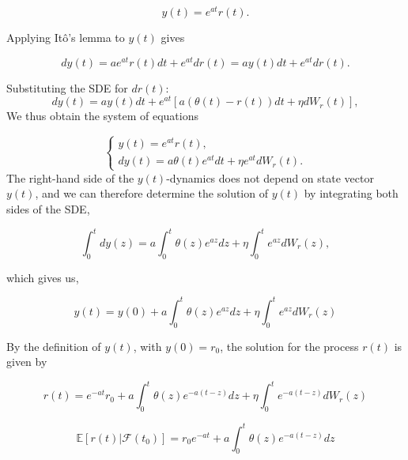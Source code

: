     \begin{equation}
        y(t) = e^{a t} r(t). 
    \end{equation}

    \noindent
    Applying Itô's lemma to \(y(t)\) gives

    \begin{equation}
        dy(t) = a e^{a t} r(t) dt + e^{a t} dr(t) = a y(t) dt + e^{a t} dr(t).
    \end{equation}

    \noindent
    Substituting the SDE for \(dr(t)\):
    \begin{equation}
        dy(t) = a y(t)dt + e^{a t}[a (\theta(t) - r(t))dt + \eta dW_r(t)],
    \end{equation}
    We thus obtain the system of equations
    
    \[
    \begin{cases}
    y(t) = e^{a t}r(t), \\
    dy(t) = a\theta(t)e^{a t}dt + \eta e^{a t}dW_r(t).
    \end{cases}
    \]
    The right-hand side of the \( y(t) \)-dynamics does not depend on state vector \( y(t) \), and we can therefore determine the solution of \( y(t) \) by integrating both sides of the SDE,
    
    \begin{equation}
        \int_0^t dy(z) = a \int_0^t \theta(z)e^{a z}dz + \eta \int_0^t e^{a z}dW_r(z),
    \end{equation}

    \noindent
    which gives us,
    
    \begin{equation}
        y(t) = y(0) + a \int_0^t \theta(z)e^{a z}dz + \eta \int_0^t e^{a z}dW_r(z)
    \end{equation}

    \noindent
    By the definition of \( y(t) \), with \( y(0) = r_0 \), the solution for the process \( r(t) \) is given by 

    \begin{equation}
        r(t) = e^{-a t}r_0 + a \int_0^t \theta(z)e^{-a(t-z)}dz + \eta \int_0^t e^{-a(t-z)}dW_r(z)
    \end{equation}

    \begin{equation}
        \mathbb{E}[r(t)|\mathcal{F}(t_0)] = r_0 e^{-a t} + a \int_0^t \theta(z) e^{-a(t-z)} dz
    \end{equation}

